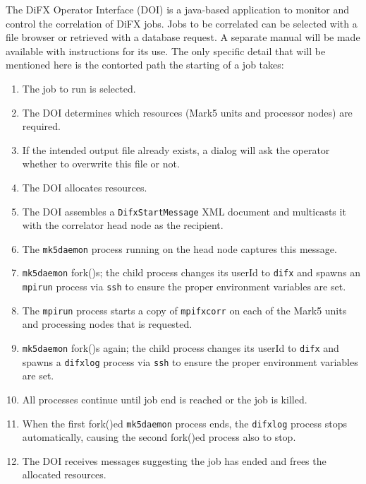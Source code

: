 The DiFX Operator Interface (DOI) is a java-based application to monitor and control the correlation of DiFX jobs.
Jobs to be correlated can be selected with a file browser or retrieved with a database request.
A separate manual \cite{doi} will be made available with instructions for its use.
The only specific detail that will be mentioned here is the contorted path the starting of a job takes:
\begin{enumerate}
\item The job to run is selected.
\item The DOI determines which resources (Mark5 units and processor nodes) are required.
\item If the intended output file already exists, a dialog will ask the operator whether to overwrite this file or not.
\item The DOI allocates resources.
\item The DOI assembles a {\tt DifxStartMessage} XML document and multicasts it with the correlator head node as the recipient.
\item The {\tt mk5daemon} process running on the head node captures this message.
\item {\tt mk5daemon} fork()s; the child process changes its userId to {\tt difx} and spawns an {\tt mpirun} process via {\tt ssh} to ensure the proper environment variables are set.
\item The {\tt mpirun} process starts a copy of {\tt mpifxcorr} on each of the Mark5 units and processing nodes that is requested.
\item {\tt mk5daemon} fork()s again; the child process changes its userId to {\tt difx} and spawns a {\tt difxlog} process via {\tt ssh} to ensure the proper environment variables are set.
\item All processes continue until job end is reached or the job is killed.
\item When the first fork()ed {\tt mk5daemon} process ends, the {\tt difxlog} process stops automatically, causing the second fork()ed process also to stop.
\item The DOI receives messages suggesting the job has ended and frees the allocated resources.
\end{enumerate}








